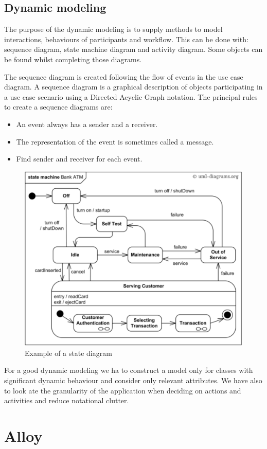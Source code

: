 \documentclass[12pt, a4paper]{report}
\newtheorem[style=M,bodystyle=\normalfont]{theorem}{Theorem}
\newtheorem[style=M,bodystyle=\normalfont]{corollary}{Corollary}
\newtheorem[style=M,bodystyle=\normalfont]{lemma}{Lemma}
\newtheorem[style=M,bodystyle=\normalfont]{definition}{Definition}
\begin{document}
\section{Dynamic modeling}
    The purpose of the dynamic modeling is to supply methods to model interactions, behaviours of participants and workflow. This can be done with: sequence diagram, state machine diagram and activity diagram. Some objects can be found whilst completing those diagrams.
    \par
    The sequence diagram is created following the flow of events in the use case diagram. A sequence diagram is a graphical description of objects participating in a use case scenario using a Directed Acyclic Graph notation.
    The principal rules to create a sequence diagrams are: 
    \begin{itemize}
        \item An event always has a sender and a receiver.
        \item The representation of the event is sometimes called a message.
        \item Find sender and receiver for each event.
    \end{itemize}
    \begin{figure}
        \centering
        \includegraphics[width=0.5\linewidth]{images/state.png}
        \caption{Example of a state diagram}
    \end{figure}
    \par
    For a good dynamic modeling we ha to construct a model only for classes with significant dynamic behaviour and consider only relevant attributes. We have also to look ate the granularity of the application when deciding on actions and activities and reduce notational clutter.

\newpage

\chapter{Alloy}
\end{document}
